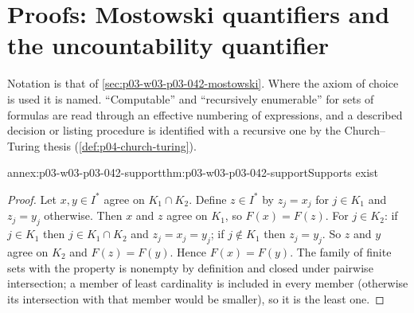 \section{Proofs: Mostowski quantifiers and the uncountability quantifier}
\label{sec:annex-p03-w03-p03-042}

Notation is that of \cref{sec:p03-w03-p03-042-mostowski}.  Where the
axiom of choice is used it is named.  ``Computable'' and ``recursively
enumerable'' for sets of formulas are read through an effective numbering
of expressions, and a described decision or listing procedure is
identified with a recursive one by the Church--Turing thesis
(\cref{def:p04-church-turing}).

\begin{annexitem}{annex:p03-w03-p03-042-support}{thm:p03-w03-p03-042-support}{Supports exist}
\begin{proof}
Let \(x,y\in I^{*}\) agree on \(K_1\cap K_2\).  Define \(z\in I^{*}\) by
\(z_j=x_j\) for \(j\in K_1\) and \(z_j=y_j\) otherwise.  Then \(x\) and
\(z\) agree on \(K_1\), so \(F(x)=F(z)\).  For \(j\in K_2\): if
\(j\in K_1\) then \(j\in K_1\cap K_2\) and \(z_j=x_j=y_j\); if \(j\notin
K_1\) then \(z_j=y_j\).  So \(z\) and \(y\) agree on \(K_2\) and
\(F(z)=F(y)\).  Hence \(F(x)=F(y)\).  The family of finite sets with the
property is nonempty by definition and closed under pairwise intersection;
a member of least cardinality is included in every member (otherwise its
intersection with that member would be smaller), so it is the least one.
\end{proof}
\end{annexitem}

